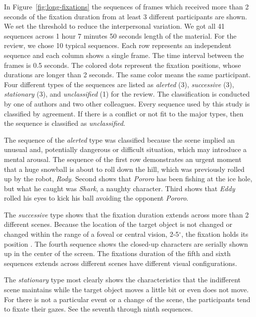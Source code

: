 \documentclass[10pt,letterpaper]{article}
\begin{document}
In Figure~\ref{fig:long-fixations} the sequences of frames which received more than 2 seconds of the fixation duration from at least 3 different participants are shown. We set the threshold to reduce the interpersonal variation. We got all 41 sequences across 1 hour 7 minutes 50 seconds length of the material. For the review, we chose 10 typical sequences. Each row represents an independent sequence and each column shows a single frame. The time interval between the frames is 0.5 seconds. The colored dots represent the fixation positions, whose durations are longer than 2 seconds. The same color means the same participant. Four different types of the sequences are listed as \textit{alerted} (3), \textit{successive} (3), \textit{stationary} (3), and \textit{unclassified} (1) for the review. The classification is conducted by one of authors and two other colleagues. Every sequence used by this study is classified by agreement. If there is a conflict or not fit to the major types, then the sequence is classified as \textit{unclassified}.

The sequence of the \textit{alerted} type was classified because the scene implied an unusual and, potentially dangerous or difficult situation, which may introduce a mental arousal. The sequence of the first row demonstrates an urgent moment that a huge snowball is about to roll down the hill, which was previously rolled up by the robot, \textit{Rody}. Second shows that \textit{Pororo} has been fishing at the ice hole, but what he caught was \textit{Shark}, a naughty character. Third shows that \textit{Eddy} rolled his eyes to kick his ball avoiding the opponent \textit{Pororo}.

The \textit{successive} type shows that the fixation duration extends across more than 2 different scenes. Because the location of the target object is not changed or changed within the range of a foveal or central vision, 2-5$^{\circ}$, the fixation holds its position \cite{mcmorris2014acquisition}. The fourth sequence shows the closed-up characters are serially shown up in the center of the screen. The fixations duration of the fifth and sixth sequences extends across different scenes have different visual configurations.

The \textit{stationary} type most clearly shows the characteristics that the indifferent scene maintains while the target object moves a little bit or even does not move. For there is not a particular event or a change of the scene, the participants tend to fixate their gazes. See the seventh through ninth sequences.
\end{document}
